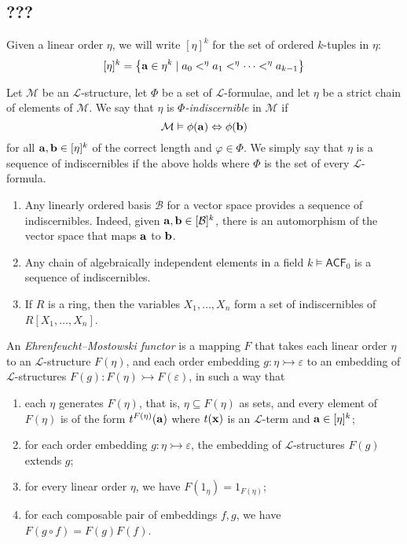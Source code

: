 \subsection{???}
Given a linear order \( \eta \), we will write \( [\eta]^k \) for the set of ordered \( k \)-tuples in \( \eta \):
\[ [\eta]^k = \qty{\vb a \in \eta^k \mid a_0 <^\eta a_1 <^\eta \dots <^\eta a_{k-1}} \]
\begin{definition}
	Let \( \mathcal M \) be an \( \mathcal L \)-structure, let \( \Phi \) be a set of \( \mathcal L \)-formulae, and let \( \eta \) be a strict chain of elements of \( \mathcal M \).
	We say that \( \eta \) is \emph{\( \Phi \)-indiscernible} in \( \mathcal M \) if
	\[ \mathcal M \vDash \phi(\vb a) \Leftrightarrow \phi(\vb b) \]
	for all \( \vb a, \vb b \in [\eta]^k \) of the correct length and \( \varphi \in \Phi \).
	We simply say that \( \eta \) is a sequence of indiscernibles if the above holds where \( \Phi \) is the set of every \( \mathcal L \)-formula.
\end{definition}
\begin{example}
	\begin{enumerate}
		\item Any linearly ordered basis \( \mathcal B \) for a vector space provides a sequence of indiscernibles.
			Indeed, given \( \vb a, \vb b \in [\mathcal B]^k \), there is an automorphism of the vector space that maps \( \vb a \) to \( \vb b \).
		\item Any chain of algebraically independent elements in a field \( k \vDash \mathsf{ACF}_0 \) is a sequence of indiscernibles.
		\item If \( R \) is a ring, then the variables \( X_1, \dots, X_n \) form a set of indiscernibles of \( R[X_1, \dots, X_n] \).
	\end{enumerate}
\end{example}
\begin{definition}
	An \emph{Ehrenfeucht--Mostowski functor} is a mapping \( F \) that takes each linear order \( \eta \) to an \( \mathcal L \)-structure \( F(\eta) \), and each order embedding \( g : \eta \rightarrowtail \varepsilon \) to an embedding of \( \mathcal L \)-structures \( F(g) : F(\eta) \rightarrowtail F(\varepsilon) \), in such a way that
	\begin{enumerate}
		\item each \( \eta \) generates \( F(\eta) \), that is, \( \eta \subseteq F(\eta) \) as sets, and every element of \( F(\eta) \) is of the form \( t^{F(\eta)}(\vb a) \) where \( t(\vb x) \) is an \( \mathcal L \)-term and \( \vb a \in [\eta]^k \);
		\item for each order embedding \( g : \eta \rightarrowtail \varepsilon \), the embedding of \( \mathcal L \)-structures \( F(g) \) extends \( g \);
		\item for every linear order \( \eta \), we have \( F(1_\eta) = 1_{F(\eta)} \);
		\item for each composable pair of embeddings \( f, g \), we have \( F(g\circ f) = F(g)F(f) \).
	\end{enumerate}
\end{definition}
